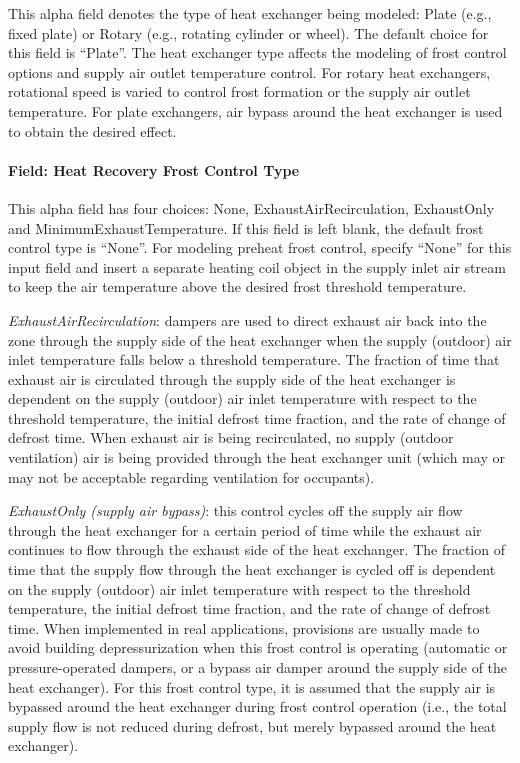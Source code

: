 This alpha field denotes the type of heat exchanger being modeled: Plate (e.g., fixed plate) or Rotary (e.g., rotating cylinder or wheel). The default choice for this field is ``Plate''. The heat exchanger type affects the modeling of frost control options and supply air outlet temperature control. For rotary heat exchangers, rotational speed is varied to control frost formation or the supply air outlet temperature. For plate exchangers, air bypass around the heat exchanger is used to obtain the desired effect.

\paragraph{Field: Heat Recovery Frost Control Type}\label{field-heat-recovery-frost-control-type-1}

This alpha field has four choices: None, ExhaustAirRecirculation, ExhaustOnly and MinimumExhaustTemperature. If this field is left blank, the default frost control type is ``None''. For modeling preheat frost control, specify ``None'' for this input field and insert a separate heating coil object in the supply inlet air stream to keep the air temperature above the desired frost threshold temperature.

\emph{ExhaustAirRecirculation}: dampers are used to direct exhaust air back into the zone through the supply side of the heat exchanger when the supply (outdoor) air inlet temperature falls below a threshold temperature. The fraction of time that exhaust air is circulated through the supply side of the heat exchanger is dependent on the supply (outdoor) air inlet temperature with respect to the threshold temperature, the initial defrost time fraction, and the rate of change of defrost time. When exhaust air is being recirculated, no supply (outdoor ventilation) air is being provided through the heat exchanger unit (which may or may not be acceptable regarding ventilation for occupants).

\emph{ExhaustOnly (supply air bypass)}: this control cycles off the supply air flow through the heat exchanger for a certain period of time while the exhaust air continues to flow through the exhaust side of the heat exchanger. The fraction of time that the supply flow through the heat exchanger is cycled off is dependent on the supply (outdoor) air inlet temperature with respect to the threshold temperature, the initial defrost time fraction, and the rate of change of defrost time. When implemented in real applications, provisions are usually made to avoid building depressurization when this frost control is operating (automatic or pressure-operated dampers, or a bypass air damper around the supply side of the heat exchanger). For this frost control type, it is assumed that the supply air is bypassed around the heat exchanger during frost control operation (i.e., the total supply flow is not reduced during defrost, but merely bypassed around the heat exchanger).

